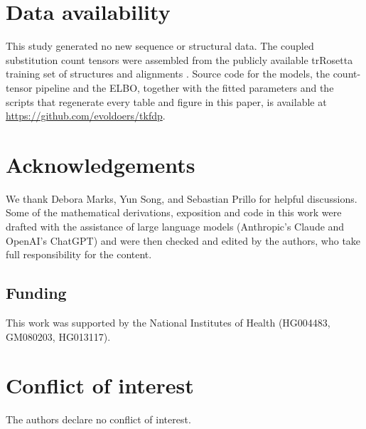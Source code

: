 \documentclass[11pt]{article}
\begin{document}
\label{endofbody}

\section*{Data availability}

This study generated no new sequence or structural data. The coupled
substitution count tensors were assembled from the publicly available
trRosetta training set of structures and alignments \citep{Yang2020trRosetta}.
Source code for the models, the count-tensor pipeline and the ELBO, together
with the fitted parameters and the scripts that regenerate every table and
figure in this paper, is available at
\url{https://github.com/evoldoers/tkfdp}.

\section*{Acknowledgements}

We thank Debora Marks, Yun Song, and Sebastian Prillo for helpful discussions.
Some of the mathematical derivations, exposition and code in this work were
drafted with the assistance of large language models (Anthropic's Claude and
OpenAI's ChatGPT) and were then checked and edited by the authors, who take full
responsibility for the content.

\subsection*{Funding}

This work was supported by the National Institutes of Health
(HG004483, GM080203, HG013117).

\section*{Conflict of interest}

The authors declare no conflict of interest.

\newpage


\end{document}
